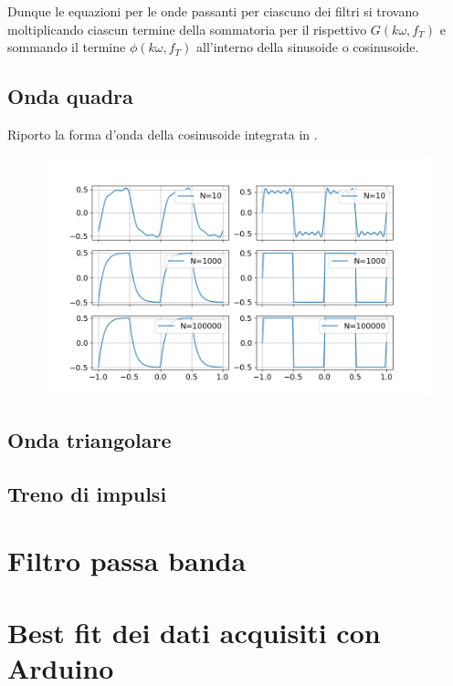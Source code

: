 \documentclass{article}
\begin{document}
Dunque le equazioni per le onde passanti per ciascuno dei filtri si trovano
moltiplicando ciascun termine della sommatoria per il rispettivo 
$G \left( k\omega,f_T\right)$ e sommando il termine $\phi \left( k\omega,f_T\right)$ 
all'interno della sinusoide o cosinusoide.
      

    
    \subsection{Onda quadra}
        Riporto la forma d'onda della cosinusoide integrata in . 
            \begin{figure}[H]
                \centering
                \includegraphics[width=1.2\textwidth]{fousharkfins.png} %
                \caption{}
                \label{fig:shark1}
            \end{figure}

    \subsection{Onda triangolare}
    \subsection{Treno di impulsi}




\section{Filtro passa banda}


\section{Best fit dei dati acquisiti con Arduino}
\end{document}
